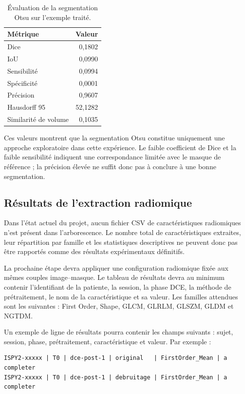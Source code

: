 \begin{table}[H]
\centering
\caption{Évaluation de la segmentation Otsu sur l'exemple traité.}
\label{tab:metriques_otsu}
\begin{tabular}{lr}
\toprule
Métrique & Valeur \\
\midrule
Dice & 0,1802 \\
IoU & 0,0990 \\
Sensibilité & 0,0994 \\
Spécificité & 0,0001 \\
Précision & 0,9607 \\
Hausdorff 95 & 52,1282 \\
Similarité de volume & 0,1035 \\
\bottomrule
\end{tabular}
\end{table}

Ces valeurs montrent que la segmentation Otsu constitue uniquement une approche exploratoire dans cette expérience. Le faible coefficient de Dice et la faible sensibilité indiquent une correspondance limitée avec le masque de référence ; la précision élevée ne suffit donc pas à conclure à une bonne segmentation.

\subsection{Résultats de l'extraction radiomique}
\label{subsec:resultats_radiomique}

Dans l'état actuel du projet, aucun fichier CSV de caractéristiques radiomiques n'est présent dans l'arborescence. Le nombre total de caractéristiques extraites, leur répartition par famille et les statistiques descriptives ne peuvent donc pas être rapportés comme des résultats expérimentaux définitifs.

La prochaine étape devra appliquer une configuration radiomique fixée aux mêmes couples image--masque. Le tableau de résultats devra au minimum contenir l'identifiant de la patiente, la session, la phase DCE, la méthode de prétraitement, le nom de la caractéristique et sa valeur. Les familles attendues sont les suivantes : First Order, Shape, GLCM, GLRLM, GLSZM, GLDM et NGTDM.

Un exemple de ligne de résultats pourra contenir les champs suivants : sujet, session, phase, prétraitement, caractéristique et valeur. Par exemple :

\begin{lstlisting}[basicstyle=\small\ttfamily]
ISPY2-xxxxx | T0 | dce-post-1 | original   | FirstOrder_Mean | a completer
ISPY2-xxxxx | T0 | dce-post-1 | debruitage | FirstOrder_Mean | a completer
\end{lstlisting}

